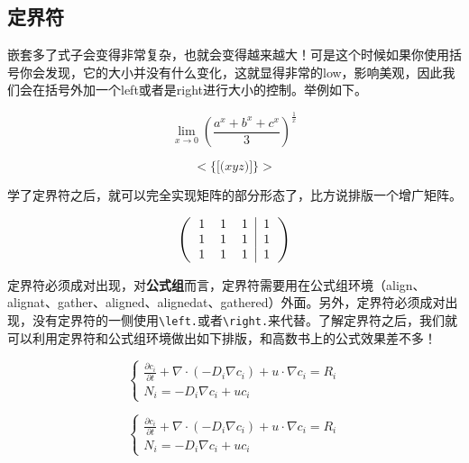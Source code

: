 \subsection{定界符}
嵌套多了式子会变得非常复杂，也就会变得越来越大！可是这个时候如果你使用括号你会发现，它的大小并没有什么变化，这就显得非常的low，影响美观，因此我们会在括号外加一个left或者是right进行大小的控制。举例如下。
\begin{codeshow}
\[
\lim\limits_{x\to 0}\left(\frac
{a^{x}+b^{x}+c^{x}}{3}\right)
^{\tfrac{1}{x}}
\]
\end{codeshow}

\begin{codeshow}
\[ \Bigg< \bigg\{ \Big[ \big( xyz \big) \Big] \bigg\} \Bigg> \]
\end{codeshow}

学了定界符之后，就可以完全实现矩阵的部分形态了，比方说排版一个增广矩阵。

\begin{codeshow}
\[
\left(
\begin{tabular}{ccc|c}
1 & 1 & 1 & 1 \\
1 & 1 & 1 & 1 \\
1 & 1 & 1 & 1 
\end{tabular}
\right)
\]
\end{codeshow}

定界符必须成对出现，对\textbf{公式组}而言，定界符需要用在公式组环境（align、alignat、gather、aligned、alignedat、gathered）外面。另外，定界符必须成对出现，没有定界符的一侧使用\lstinline|\left.|或者\lstinline|\right.|来代替。了解定界符之后，我们就可以利用定界符和公式组环境做出如下排版，和高数书上的公式效果差不多！

\begin{equation}
\left\{
\begin{gathered}
\frac{\partial c_i}{\partial t}+\nabla \cdot (-D_{i} \nabla c_{i})+u \cdot \nabla c_{i}=R_i \\
N_{i}=-D_{i}\nabla c_{i}+uc_{i}
\end{gathered}
\right.
\end{equation}

\begin{latex}
\begin{equation}
\left\{
\begin{gathered}
\frac{\partial c_i}{\partial t}+\nabla \cdot (-D_{i} \nabla c_{i})+u \cdot \nabla c_{i}=R_i \\
N_{i}=-D_{i}\nabla c_{i}+uc_{i}
\end{gathered}
\right.
\end{equation}
\end{latex}

